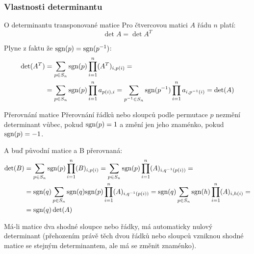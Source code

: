 \subsubsection*{Vlastnosti determinantu}

\begin{vetaN}{O determinantu transponované matice}
Pro čtvercovou matici $A$ řádu $n$ platí:
$$\det A=\det A^T$$

\begin{dukaz}
Plyne z faktu že $\mathrm{sgn}(p)=\mathrm{sgn}(p^{-1})$:
\begin{align*}
\det(A^T) & =\sum_{p\in S_n}\mathrm{sgn}(p)\prod_{i=1}^n(A^T)_{i,p(i)}=\\
 & =\sum_{p\in S_n}\mathrm{sgn}(p)\prod_{i=1}^n a_{p(i),i}=\sum_{p^{-1}\in S_n}\mathrm{sgn}(p^{-1})\prod_{i=1}^n a_{i,p^{-1}(i)}=\det(A)
\end{align*}
\end{dukaz}
\end{vetaN}

\begin{vetaN}{Přerovnání matice}
Přerovnání řádků nebo sloupců podle permutace $p$ nezmění determinant vůbec, pokud $\mathrm{sgn}(p)=1$ a změní jen jeho znaménko, pokud $\mathrm{sgn}(p)=-1$.

\begin{dukaz}
A buď původní matice a B přerovnaná:
\begin{align*}
\det(B) & =\sum_{p\in S_n}\mathrm{sgn}(p)\prod_{i=1}^n(B)_{i,p(i)} = \sum_{p\in S_n}\mathrm{sgn}(p)\prod_{i=1}^n(A)_{i,q^{-1}\left(p(i)\right)}=\\
 & =\mathrm{sgn}(q)\sum_{p\in S_n}\mathrm{sgn}(q)\mathrm{sgn}(p)\prod_{i=1}^n(A)_{i,q^{-1}\left(p(i)\right)}=\mathrm{sgn}(q)\sum_{p\in S_n}\mathrm{sgn}(h)\prod_{i=1}^n(A)_{i,h(i)}=\\
 & =\mathrm{sgn}(q)\det(A)
\end{align*}
\end{dukaz}
\end{vetaN}

\begin{dusledek}
Má-li matice dva shodné sloupce nebo řádky, má automaticky nulový determinant (přehozením právě těch dvou řádků nebo sloupců vzniknou shodné matice se stejným determinantem, ale má se změnit znaménko).
\end{dusledek}

